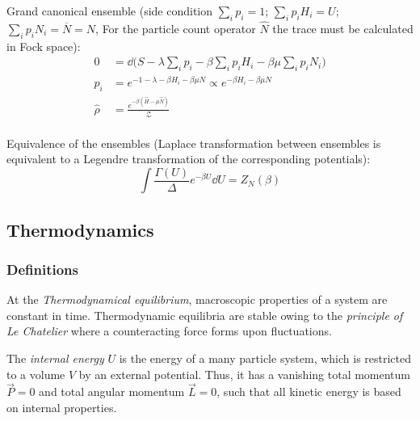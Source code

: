 			\noindent
			Grand canonical ensemble (side condition $\sum_i p_i = 1$; $\sum_i p_i H_i = U$; $\sum_i p_i N_i = \overline{N} = N$, For the particle count operator $\hat{N}$ the trace must be calculated in Fock space):
			\begin{equation}
				\begin{aligned}
					0 &= \dd \big( S - \lambda \sum_i p_i - \beta \sum_i p_i H_i - \beta\mu \sum_i p_i N_i \big) \\
					p_i &= e^{-1-\lambda-\beta H_i-\beta\mu N} \propto e^{-\beta H_i - \beta\mu N} \\
					\hat{\rho} &= \frac{e^{-\beta (\hat{H} - \mu \hat{N})}}{\mathcal{Z}} \\
				\end{aligned}
			\end{equation}

			\noindent
			Equivalence of the ensembles (Laplace transformation between ensembles is equivalent to a Legendre transformation of the corresponding potentials):
			\begin{equation}
				\int \frac{\Gamma(U)}{\Delta} e^{-\beta U} \dd U = Z_N(\beta)
			\end{equation}


	\subsection{Thermodynamics}
		\subsubsection{Definitions}
			At the \emph{Thermodynamical equilibrium}, macroscopic properties of a system are constant in time.
			Thermodynamic equilibria are stable owing to the \emph{principle of Le Chatelier} where a counteracting force forms upon fluctuations.\vsp

			The \emph{internal energy} $U$ is the energy of a many particle system, which is restricted to a volume $V$ by an external potential. Thus, it has a vanishing total momentum $\vec{P}=0$ and total angular momentum $\vec{L} = 0$, such that all kinetic energy is based on internal properties. \vsp

